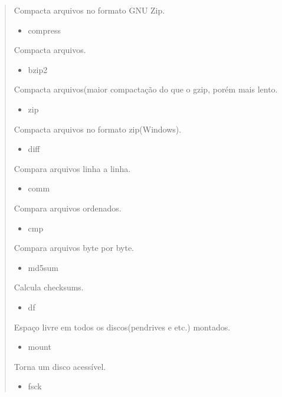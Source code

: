 \documentclass[a4paper,10pt,portuguese]{sphinxmanual}
\begin{document}
\begin{quote}
\begin{description}
Compacta arquivos no formato GNU Zip.
\begin{itemize}
\item {} 
compress

\end{itemize}

Compacta arquivos.
\begin{itemize}
\item {} 
bzip2

\end{itemize}

Compacta arquivos(maior compactação do que o gzip, porém
mais lento.
\begin{itemize}
\item {} 
zip

\end{itemize}

Compacta arquivos no formato zip(Windows).
\begin{itemize}
\item {} 
diff

\end{itemize}

Compara arquivos linha a linha.
\begin{itemize}
\item {} 
comm

\end{itemize}

Compara arquivos ordenados.
\begin{itemize}
\item {} 
cmp

\end{itemize}

Compara arquivos byte por byte.
\begin{itemize}
\item {} 
md5sum

\end{itemize}

Calcula checksums.
\begin{itemize}
\item {} 
df

\end{itemize}

Espaço livre em todos os discos(pendrives e etc.) montados.
\begin{itemize}
\item {} 
mount

\end{itemize}

Torna um disco acessível.
\begin{itemize}
\item {} 
fsck


\end{itemize}
\end{description}
\end{quote}
\end{document}
